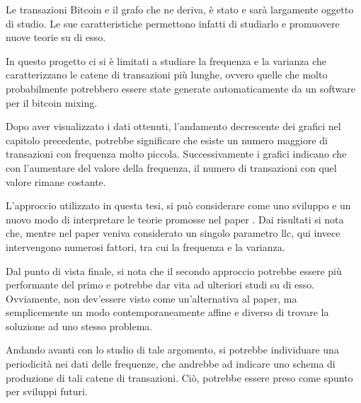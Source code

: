 Le transazioni Bitcoin e il grafo che ne deriva, è stato e sarà largamente oggetto di studio. Le sue caratteristiche permettono infatti di studiarlo e promuovere nuove teorie su di esso.

In questo progetto ci si è limitati a studiare la frequenza e la varianza che caratterizzano le catene di transazioni più lunghe, ovvero quelle che molto probabilmente potrebbero essere state generate automaticamente da un software per il bitcoin mixing. 

Dopo aver visualizzato i dati ottenuti, l'andamento decrescente dei grafici nel capitolo precedente, potrebbe significare che esiste un numero maggiore di transazioni con frequenza molto piccola. Successivamente i grafici indicano che con l'aumentare del valore della frequenza, il numero di transazioni con quel valore rimane costante.

L'approccio utilizzato in questa tesi, si può considerare come uno sviluppo e un nuovo modo di interpretare le teorie promosse nel paper \cite{ddp-ltcbh-17}. Dai risultati si nota che, mentre nel paper veniva considerato un singolo parametro llc, qui invece intervengono numerosi fattori, tra cui la frequenza e la varianza.

Dal punto di vista finale, si nota che il secondo approccio potrebbe essere più performante del primo e potrebbe dar vita ad ulteriori studi su di esso. Ovviamente, non dev'essere visto come un'alternativa al paper, ma semplicemente un modo contemporaneamente affine e diverso di trovare la soluzione ad uno stesso problema. 

Andando avanti con lo studio di tale argomento, si potrebbe individuare una periodicità nei dati delle frequenze, che andrebbe ad indicare uno schema di produzione di tali catene di transazioni. Ciò, potrebbe essere preso come spunto per sviluppi futuri. 